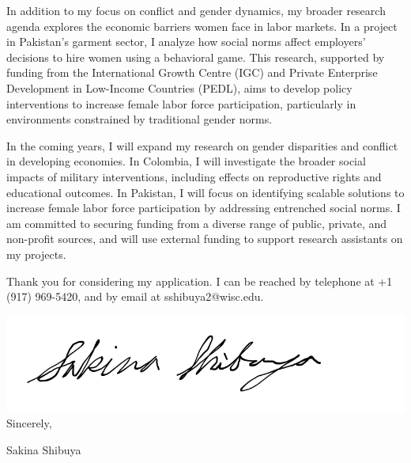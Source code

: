 \documentclass[12pt]{letter}
\begin{document}
In addition to my focus on conflict and gender dynamics, my broader research agenda explores the economic barriers women face in labor markets. 
In a project in Pakistan's garment sector, I analyze how social norms affect employers' decisions 
to hire women using a behavioral game. This research, supported by funding from the International Growth Centre (IGC) and Private Enterprise Development in Low-Income Countries (PEDL), 
aims to develop policy interventions to increase female labor force participation, particularly in environments constrained by traditional gender norms.

In the coming years, I will expand my research on gender disparities and conflict in developing economies. 
In Colombia, I will investigate the broader social impacts of military interventions, including effects on reproductive rights and educational outcomes. 
In Pakistan, I will focus on identifying scalable solutions to increase female labor force participation by addressing entrenched social norms. 
I am committed to securing funding from a diverse range of public, private, and non-profit sources, and 
will use external funding to support research assistants on my projects.

Thank you for considering my application. 
I can be reached by telephone at +1 (917) 969-5420, and by email at sshibuya2@wisc.edu.

\bigskip

\includegraphics[height=4\baselineskip]{signature.png}  \\

\vspace*{-6.5\baselineskip}Sincerely, 

\vspace{2.5\baselineskip}Sakina Shibuya
\end{document}
